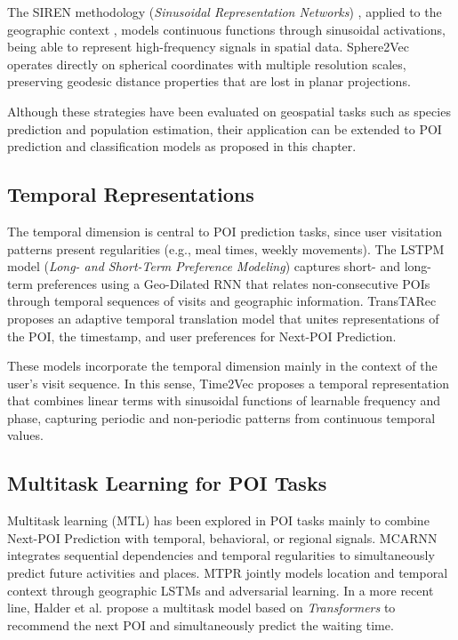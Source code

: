 The SIREN methodology (\textit{Sinusoidal Representation Networks}) \cite{sitzmann2020implicit}, applied to the geographic context \cite{russwurm2024geographiclocationencodingspherical}, models continuous functions through sinusoidal activations, being able to represent high-frequency signals in spatial data. Sphere2Vec \cite{mai2023sphere2vecgeneralpurposelocationrepresentation} operates directly on spherical coordinates with multiple resolution scales, preserving geodesic distance properties that are lost in planar projections.

Although these strategies have been evaluated on geospatial tasks such as species prediction and population estimation, their application can be extended to POI prediction and classification models as proposed in this chapter.

\subsection{Temporal Representations}

The temporal dimension is central to POI prediction tasks, since user visitation patterns present regularities (e.g., meal times, weekly movements). The LSTPM model (\textit{Long- and Short-Term Preference Modeling}) \cite{sun2020go} captures short- and long-term preferences using a Geo-Dilated RNN that relates non-consecutive POIs through temporal sequences of visits and geographic information. TransTARec \cite{sun2024transtarec} proposes an adaptive temporal translation model that unites representations of the POI, the timestamp, and user preferences for Next-POI Prediction.

These models incorporate the temporal dimension mainly in the context of the user's visit sequence. In this sense, Time2Vec \cite{kazemi2019time2vec} proposes a temporal representation that combines linear terms with sinusoidal functions of learnable frequency and phase, capturing periodic and non-periodic patterns from continuous temporal values.

\subsection{Multitask Learning for POI Tasks}

Multitask learning (MTL) \cite{caruana1997multitask} has been explored in POI tasks mainly to combine Next-POI Prediction with temporal, behavioral, or regional signals. MCARNN \cite{Liao2018} integrates sequential dependencies and temporal regularities to simultaneously predict future activities and places. MTPR \cite{Xia2020} jointly models location and temporal context through geographic LSTMs and adversarial learning. In a more recent line, Halder et al. \cite{Halder2022} propose a multitask model based on \textit{Transformers} to recommend the next POI and simultaneously predict the waiting time.

